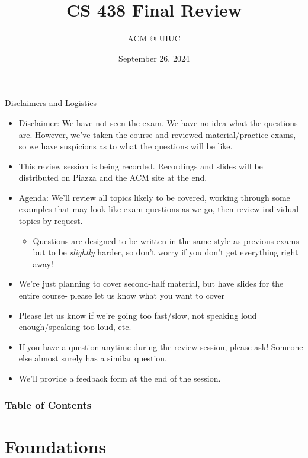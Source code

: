 \documentclass{beamer}
\title[ACM fun]{CS 438 Final Review}
\author{ACM @ UIUC}
\date{September 26, 2024}
\begin{document}
\begin{frame}
  \titlepage
\end{frame}

\begin{frame}[t]{Disclaimers and Logistics}
  \begin{itemize}
  \item \alert{Disclaimer:} We have not seen the exam. We have no idea what the questions are. However, we've taken the course and reviewed material/practice exams, so we have \alert{suspicions} as to what the questions will be like.
  \item This review session is being recorded. Recordings and slides will be distributed on Piazza and the ACM site at the end.
  \item \alert{Agenda:} We'll review all topics likely to be covered, working through some examples that may look like exam questions as we go, then review individual topics by request.
  \begin{itemize}
      \item Questions are designed to be written in the same style as previous exams but to be \textit{slightly} harder, so don't worry if you don't get everything right away!
  \end{itemize}
  \item We're just planning to cover second-half material, but have slides for the entire course- please let us know what you want to cover
  \item Please let us know if we're going too fast/slow, not speaking loud enough/speaking too loud, etc.
  \item If you have a question anytime during the review session, please ask! Someone else almost surely has a similar question.
  \item We'll provide a feedback form at the end of the session.
  \end{itemize}
\end{frame}

\begin{frame}
\frametitle{Table of Contents}
\tableofcontents
\end{frame}

\section{Foundations}
\end{document}
